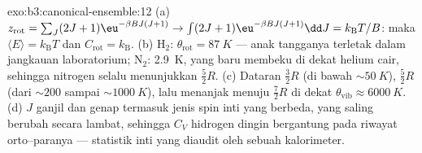 \begin{solution}{exo:b3:canonical-ensemble:12}
(a) $z_{\text{rot}} = \sum_J(2J+1)\eu^{-\beta BJ(J+1)}
\to \int(2J+1)\eu^{-\beta BJ(J+1)}\dd J = k_{\text{B}}T/B$: maka
$\langle E\rangle = k_{\text{B}}T$ dan $C_{\text{rot}} =
k_{\text{B}}$. (b) H$_2$: $\theta_{\text{rot}} = \qty{87}{K}$ ---
anak tangganya terletak dalam jangkauan laboratorium; N$_2$: \qty{2.9}{K},
yang baru membeku di dekat helium cair, sehingga nitrogen selalu
menunjukkan $\tfrac52 R$. (c) Dataran $\tfrac32 R$ (di bawah $\sim\qty{50}{K}$),
$\tfrac52 R$ (dari $\sim200$ sampai $\sim\qty{1000}{K}$), lalu menanjak
menuju $\tfrac72 R$ di dekat $\theta_{\text{vib}} \approx
\qty{6000}{K}$. (d) $J$ ganjil dan genap termasuk jenis spin inti yang
berbeda, yang saling berubah secara lambat, sehingga $C_V$ hidrogen
dingin bergantung pada riwayat orto--paranya --- statistik inti yang
diaudit oleh sebuah kalorimeter.
\end{solution}

